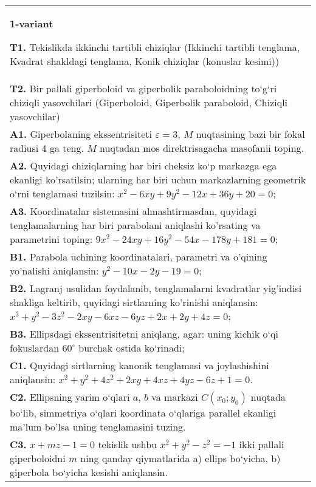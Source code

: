 \documentclass{article}
\begin{document}


\begin{tabular}{m{17cm}}
\textbf{1-variant}
\newline

\textbf{T1.} Tekislikda ikkinchi tartibli chiziqlar (Ikkinchi tartibli tenglama, Kvadrat shakldagi tenglama, Konik chiziqlar (konuslar kesimi)) \\
\textbf{T2.} Bir pallali giperboloid va giperbolik paraboloidning to‘g‘ri chiziqli yasovchilari (Giperboloid, Giperbolik paraboloid, Chiziqli yasovchilar) \\
\textbf{A1.} Giperbolaning ekssentrisiteti $\varepsilon=3$, $M$ nuqtasining bazi bir fokal radiusi 4 ga teng. $M$ nuqtadan mos direktrisagacha masofanii toping. \\
\textbf{A2.} Quyidagi chiziqlarning har biri cheksiz ko‘p markazga ega ekanligi ko'rsatilsin; ularning har biri uchun markazlarning geometrik o‘rni tenglamasi tuzilsin: $x^2-6 x y+9 y^2-12 x+36 y+20=0$; \\
\textbf{A3.} Koordinatalar sistemasini almashtirmasdan, quyidagi tenglamalarning har biri parabolani aniqlashi ko'rsating va parametrini toping: $9 x^2-24 x y+16 y^2-54 x-178 y+181=0$; \\
\textbf{B1.} Parabola uchining koordinatalari, parametri va o'qining yo'nalishi aniqlansin: $y^2-10 x-2 y-19=0$; \\
\textbf{B2.} Lagranj usulidan foydalanib, tenglamalarni kvadratlar yig'indisi shakliga keltirib, quyidagi sirtlarning ko'rinishi aniqlansin: $x^2+y^2-3 z^2-2 x y-6 x z-6 y z+2 x+2 y+4 z=0$; \\
\textbf{B3.} Ellipsdagi ekssentrisitetni aniqlang, agar: uning kichik o‘qi fokuslardan $60^{\circ}$ burchak ostida ko‘rinadi; \\
\textbf{C1.} Quyidagi sirtlarning kanonik tenglamasi va joylashishini aniqlansin: $x^2+y^2+4 z^2+2 x y+4 x z+4 y z-6 z+1=0$. \\
\textbf{C2.} Ellipsning yarim o‘qlari $a$, $b$ va markazi $C\left(x_0; y_0\right)$ nuqtada bo‘lib, simmetriya o‘qlari koordinata o‘qlariga parallel ekanligi ma’lum bo'lsa uning tenglamasini tuzing. \\
\textbf{C3.} $x+m z-1=0$ tekislik ushbu $x^2+y^2-z^2=-1$ ikki pallali giperboloidni $m$ ning qanday qiymatlarida a) ellips bo‘yicha, b) giperbola bo‘yicha kesishi aniqlansin. \\

\end{tabular}
\vspace{1cm}
\end{document}
